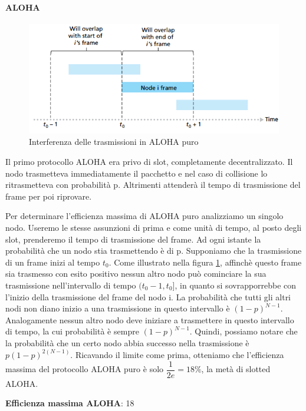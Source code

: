 \documentclass[11pt,a4paper]{article}
\begin{document}
\paragraph{ALOHA}
\begin{figure}
		\includegraphics[scale=0.6]{img/079.png}
		\caption{Interferenza delle trasmissioni in ALOHA puro}
		\label{fig: 079}
\end{figure}
Il primo protocollo ALOHA era privo di slot, completamente decentralizzato. Il nodo trasmetteva immediatamente il pacchetto e nel caso di collisione lo ritrasmetteva con probabilità p. Altrimenti attenderà il tempo di trasmissione del frame per poi riprovare.

Per determinare l'efficienza massima di ALOHA puro analizziamo un singolo nodo. Useremo le stesse assunzioni di prima e come unità di tempo, al posto degli slot, prenderemo il tempo di trasmissione del frame. Ad ogni istante la probabilità che un nodo stia trasmettendo è di p. Supponiamo che la trasmissione di un frame inizi al tempo $t_{0}$. Come illustrato nella figura \ref{fig: 079}, affinchè questo frame sia trasmesso con esito positivo nessun altro nodo può cominciare la sua trasmissione nell'intervallo di tempo $(t_{0} - 1, t_{0}]$, in quanto si sovrapporrebbe con l'inizio della trasmissione del frame del nodo i. La probabilità che tutti gli altri nodi non diano inizio a una trasmissione in questo intervallo è $(1 - p)^{N - 1}$. Analogamente nessun altro nodo deve iniziare a trasmettere in questo intervallo di tempo, la cui probabilità è sempre $(1 - p)^{N - 1}$. Quindi, possiamo notare che la probabilità che un certo nodo abbia successo nella trasmissione è $p(1 - p)^{2(N - 1)}$. Ricavando il limite come prima, otteniamo che l'efficienza massima del protocollo ALOHA puro è solo $\dfrac{1}{2e} = 18\%$, la metà di slotted ALOHA.
\begin{center}
	\textbf{Efficienza massima ALOHA}: 18%
\end{center}
\end{document}
